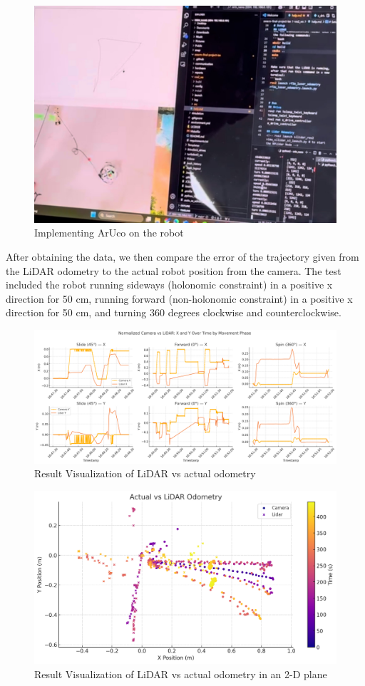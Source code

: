 \begin{figure}[H]
    \centering
    \includegraphics[width=0.6\linewidth]{assets/images/odometry/arena_robot.jpg}
    \caption{Implementing ArUco on the robot}
    \label{fig:aruco-robot}
\end{figure}

After obtaining the data, we then compare the error of the trajectory given from the LiDAR odometry to the actual robot position from the camera. The test included the robot running sideways (holonomic constraint) in a positive x direction for 50 cm, running forward (non-holonomic constraint) in a positive x direction for 50 cm, and turning 360 degrees clockwise and counterclockwise.

\begin{figure}[H]
    \centering
    \includegraphics[width=1\linewidth]{assets/images/odometry/detail_visual.png}
    \caption{Result Visualization of LiDAR vs actual odometry}
    \label{fig:detail-result}
\end{figure}

\begin{figure}[H]
    \centering
    \includegraphics[width=1\linewidth]{assets/images/odometry/testing_visual.png}
    \caption{Result Visualization of LiDAR vs actual odometry in an 2-D plane}
    \label{fig:visual-result}
\end{figure}

